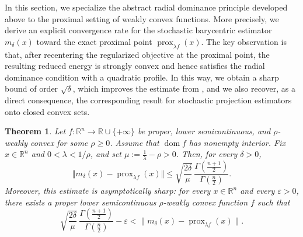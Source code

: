 \documentclass[11pt]{article}
\newcommand{\1}{\mathds{1}}
\newtheorem{theorem}{Theorem}[section]
\theoremstyle{definition}
\theoremstyle{remark}
\theoremstyle{definition}
\begin{document}
In this section, we specialize the abstract radial dominance principle developed above to the proximal setting of weakly convex functions. More precisely, we derive an explicit convergence rate for the stochastic barycentric estimator \(m_\delta(x)\) toward the exact proximal point \(\operatorname{prox}_{\lambda f}(x)\). The key observation is that, after recentering the regularized objective at the proximal point, the resulting reduced energy is strongly convex and hence satisfies the radial dominance condition with a quadratic profile. In this way, we obtain a sharp bound of order \(\sqrt{\delta}\), which improves the estimate from \cite{MPV2026}, and we also recover, as a direct consequence, the corresponding result for stochastic projection estimators onto closed convex sets.
\begin{theorem}\label{convergence}
Let $f\colon \mathbb{R}^n \to \mathbb{R}\cup \{+\infty\}$ be proper,
lower semicontinuous, and $\rho$-weakly convex for some $\rho\geq 0$.
Assume that $\operatorname{dom}f$ has nonempty interior. Fix
$x\in \mathbb{R}^n$ and $0<\lambda<1/\rho$, and set $\mu:=\frac{1}{\lambda}-\rho>0$.
Then, for every $\delta>0$,
\[
\Vert m_{\delta}(x)-\operatorname{prox}_{\lambda f}(x)\Vert
\leq
\sqrt{\frac{2\delta}{\mu}}\,
\frac{\Gamma\left(\frac{n+1}{2}\right)}
{\Gamma\left(\frac{n}{2}\right)}.
\]
Moreover, this estimate is asymptotically sharp: for every $x\in \mathbb{R}^n$ and every 
\(\varepsilon>0\), there exists a proper lower semicontinuous
\(\rho\)-weakly convex function \(f\) such that
\[
\sqrt{\frac{2\delta}{\mu}}\,
\frac{\Gamma\!\left(\frac{n+1}{2}\right)}
{\Gamma\!\left(\frac{n}{2}\right)}
-\varepsilon
<
\|m_{\delta}(x)-\operatorname{prox}_{\lambda f}(x)\|.
\]
\end{theorem}
\end{document}
